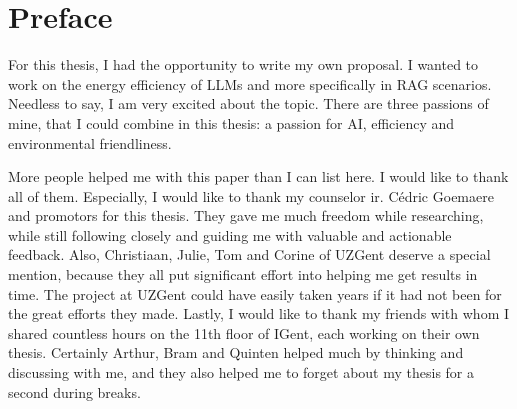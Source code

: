 
\titleformat{\chapter}{}{}{0em}{\bf\Huge}
\chapter*{Preface}

For this thesis, I had the opportunity to write my own proposal. I wanted to work on the energy efficiency of LLMs and more specifically in RAG scenarios. Needless to say, I am very excited about the topic. There are three passions of mine, that I could combine in this thesis: a passion for AI, efficiency and environmental friendliness. 


More people helped me with this paper than I can list here. I would like to thank all of them. Especially, I would like to thank my counselor ir. Cédric Goemaere and promotors for this thesis. They gave me much freedom while researching, while still following closely and guiding me with valuable and actionable feedback. Also, Christiaan, Julie, Tom and Corine of UZGent deserve a special mention, because they all put significant effort into helping me get results in time. The project at UZGent could have easily taken years if it had not been for the great efforts they made. Lastly, I would like to thank my friends with whom I shared countless hours on the 11th floor of IGent, each working on their own thesis. Certainly Arthur, Bram and Quinten helped much by thinking and discussing with me, and they also helped me to forget about my thesis for a second during breaks.